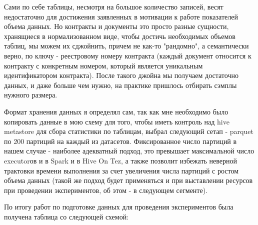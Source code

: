 \documentclass[12pt,letterpaper, onecolumn]{exam}
\begin{document}
Сами по себе таблицы, несмотря на большое количество записей, весят недостаточно для достижения заявленных в мотивации к работе показателей объема данных. Но контракты и документы это просто разные сущности, хранящиеся в нормализованном виде, чтобы достичь необходимых объемов таблиц, мы можем их сджойнить, причем не как-то "рандомно", а семантически верно, по ключу - реестровому номеру контракта (каждый документ относится к контракту с конкретным номером, который является уникальным идентификатором контракта). После такого джойна мы получаем достаточно данных, и даже больше чем нужно, на практике пришлось отбирать сэмплы нужного размера. 

Формат хранения данных я определял сам, так как мне необходимо было копировать данные в мою схему для того, чтобы иметь контроль над hive metastore для сбора статистики по таблицам, выбрал следующий сетап - parquet по 200 партиций на каждый из датасетов. Фиксированное число партиций в нашем случае - наиболее адекватный подход, это превышает максимальной число executorов и в Spark и в Hive On Tez, а также позволит избежать неверной трактовки времени выполнения за счет увеличения числа партиций с ростом объема данных (такой же подход будет применяться и при выставлении ресурсов при проведении экспериментов, об этом - в следующем сегменте).

По итогу работ по подготовке данных для проведения экспериментов была получена таблица со следующей схемой:
\end{document}

